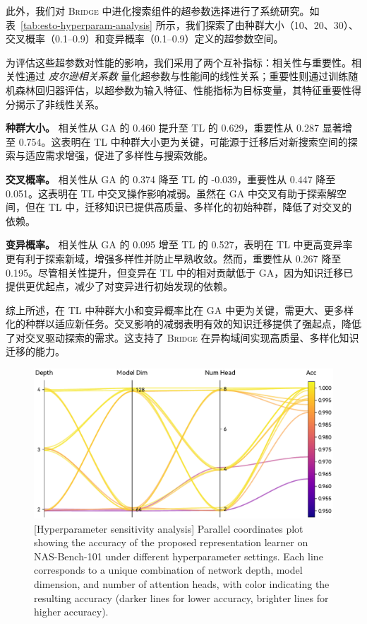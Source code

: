 \documentclass[../main.tex]{subfiles}
\begin{document}
此外，我们对 \textsc{Bridge} 中进化搜索组件的超参数选择进行了系统研究。如表~\ref{tab:esto-hyperparam-analysis} 所示，我们探索了由种群大小（10、20、30）、交叉概率（0.1–0.9）和变异概率（0.1–0.9）定义的超参数空间。

为评估这些超参数对性能的影响，我们采用了两个互补指标：相关性与重要性。相关性通过 \textit{皮尔逊相关系数} 量化超参数与性能间的线性关系；重要性则通过训练随机森林回归器评估，以超参数为输入特征、性能指标为目标变量，其特征重要性得分揭示了非线性关系。

\textbf{种群大小。}
相关性从 GA 的 0.460 提升至 TL 的 0.629，重要性从 0.287 显著增至 0.754。这表明在 TL 中种群大小更为关键，可能源于迁移后对新搜索空间的探索与适应需求增强，促进了多样性与搜索效能。

\textbf{交叉概率。}
相关性从 GA 的 0.374 降至 TL 的 -0.039，重要性从 0.447 降至 0.051。这表明在 TL 中交叉操作影响减弱。虽然在 GA 中交叉有助于探索解空间，但在 TL 中，迁移知识已提供高质量、多样化的初始种群，降低了对交叉的依赖。

\textbf{变异概率。}
相关性从 GA 的 0.095 增至 TL 的 0.527，表明在 TL 中更高变异率更有利于探索新域，增强多样性并防止早熟收敛。然而，重要性从 0.267 降至 0.195。尽管相关性提升，但变异在 TL 中的相对贡献低于 GA，因为知识迁移已提供更优起点，减少了对变异进行初始发现的依赖。

综上所述，在 TL 中种群大小和变异概率比在 GA 中更为关键，需更大、更多样化的种群以适应新任务。交叉影响的减弱表明有效的知识迁移提供了强起点，降低了对交叉驱动探索的需求。这支持了 \textsc{Bridge} 在异构域间实现高质量、多样化知识迁移的能力。

\begin{figure}
	\centering
	\includegraphics[width=.8\linewidth]{BRIDGE/hpsa.pdf}
	[Hyperparameter sensitivity analysis]{
		Parallel coordinates plot showing the accuracy of the proposed representation learner on NAS-Bench-101 under different hyperparameter settings.
		Each line corresponds to a unique combination of network depth, model dimension, and number of attention heads, with color indicating the resulting accuracy (darker lines for lower accuracy, brighter lines for higher accuracy).
	}\label{fig:hyperparam-sensitivity}
\end{figure}
\end{document}
